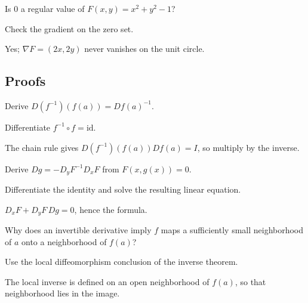 \begin{exercise}\label{exr:ii09-expand-05}
Is \(0\) a regular value of \(F(x,y)=x^2+y^2-1\)?
\end{exercise}
\begin{hint}
Check the gradient on the zero set.
\end{hint}
\begin{solution}
Yes; \(\nabla F=(2x,2y)\) never vanishes on the unit circle.
\end{solution}

\subsection*{Proofs}

\begin{exercise}\label{exr:ii09-expand-06}
Derive \(D(f^{-1})(f(a))=Df(a)^{-1}\).
\end{exercise}
\begin{hint}
Differentiate \(f^{-1}\circ f=\mathrm{id}\).
\end{hint}
\begin{solution}
The chain rule gives \(D(f^{-1})(f(a))Df(a)=I\), so multiply by the inverse.
\end{solution}

\begin{exercise}\label{exr:ii09-expand-07}
Derive \(Dg=-D_yF^{-1}D_xF\) from \(F(x,g(x))=0\).
\end{exercise}
\begin{hint}
Differentiate the identity and solve the resulting linear equation.
\end{hint}
\begin{solution}
\(D_xF+D_yF\,Dg=0\), hence the formula.
\end{solution}

\begin{exercise}\label{exr:ii09-expand-08}
Why does an invertible derivative imply \(f\) maps a sufficiently small neighborhood of \(a\) onto a neighborhood of \(f(a)\)?
\end{exercise}
\begin{hint}
Use the local diffeomorphism conclusion of the inverse theorem.
\end{hint}
\begin{solution}
The local inverse is defined on an open neighborhood of \(f(a)\), so that neighborhood lies in the image.
\end{solution}

